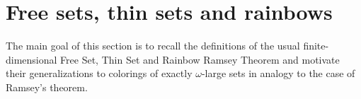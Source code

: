 \documentclass{article}
\def\PP{\mathbb{P}}
\newcommand{\Psf}{\mathsf{P}}
\newcommand{\Qsf}{\mathsf{Q}}
\def\Q{\mathcal{Q}}
\newcommand{\RCA}[0]{\mathsf{RCA}}
\newcommand{\W}{\mathrm{W}}
\newcommand{\sW}{\mathrm{sW}}
\numberwithin{theorem}{section}
\newcommand{\ludovic}[1]{\textcolor{blue}{#1}}
\newcommand{\lorenzo}[1]{\textcolor{orange}{#1}}
\begin{document}


\section{Free sets, thin sets and rainbows}\label{sec:fs_ts_rainbow}

The main goal of this section is to recall the definitions of the usual finite-dimensional Free Set, Thin Set and Rainbow Ramsey Theorem and motivate their generalizations to colorings of exactly $\omega$-large sets in analogy to the case of Ramsey's theorem. %
\end{document}
